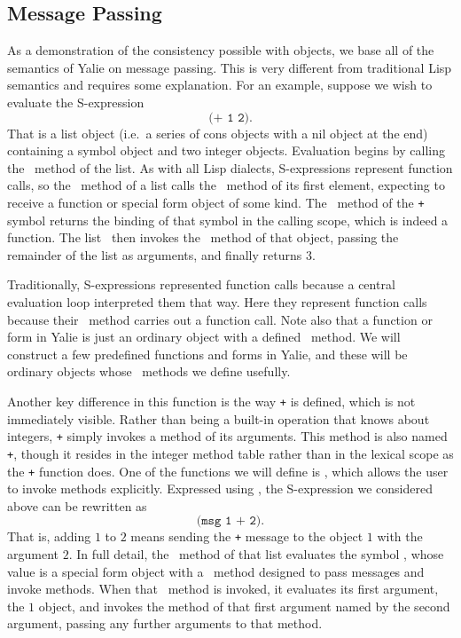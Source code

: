 \documentclass[twocolumn]{article}
\begin{document}
\subsection*{Message Passing}
As a demonstration of the consistency possible with objects, we base
all of the semantics of Yalie on message passing. This is very
different from traditional Lisp semantics and requires some
explanation. For an example, suppose we wish to evaluate the
S-expression
\[ \texttt{(+ 1 2)}. \] That is a list object (i.e.\ a series of cons
objects with a nil object at the end) containing a symbol object and
two integer objects. Evaluation begins by calling the \eval\ method of
the list. As with all Lisp dialects, S-expressions represent function
calls, so the \eval\ method of a list calls the \eval\ method of its
first element, expecting to receive a function or special form object
of some kind. The \eval\ method of the \texttt{+} symbol returns the
binding of that symbol in the calling scope, which is indeed a
function. The list \eval\ then invokes the \call\ method of that
object, passing the remainder of the list as arguments, and finally
returns $3$.

Traditionally, S-expressions represented function calls because a
central evaluation loop interpreted them that way. Here they represent
function calls because their \eval\ method carries out a function
call. Note also that a function or form in Yalie is just an ordinary
object with a defined \call\ method. We will construct a few
predefined functions and forms in Yalie, and these will be ordinary
objects whose \call\ methods we define usefully.

Another key difference in this function is the way \texttt{+} is
defined, which is not immediately visible. Rather than being a
built-in operation that knows about integers, \texttt{+} simply
invokes a method of its arguments. This method is also named
\texttt{+}, though it resides in the integer method table rather than
in the lexical scope as the \texttt{+} function does. One of the
functions we will define is \msg, which allows the user to invoke
methods explicitly. Expressed using \msg, the S-expression we
considered above can be rewritten as
\[\texttt{(msg 1 + 2)}.\]
That is, adding $1$ to $2$ means sending the \texttt{+} message to the
object $1$ with the argument $2$. In full detail, the \eval\ method of
that list evaluates the symbol \msg, whose value is a special form
object with a \call\ method designed to pass messages and invoke
methods. When that \call\ method is invoked, it evaluates its first
argument, the $1$ object, and invokes the method of that first
argument named by the second argument, passing any further arguments
to that method.
\end{document}
